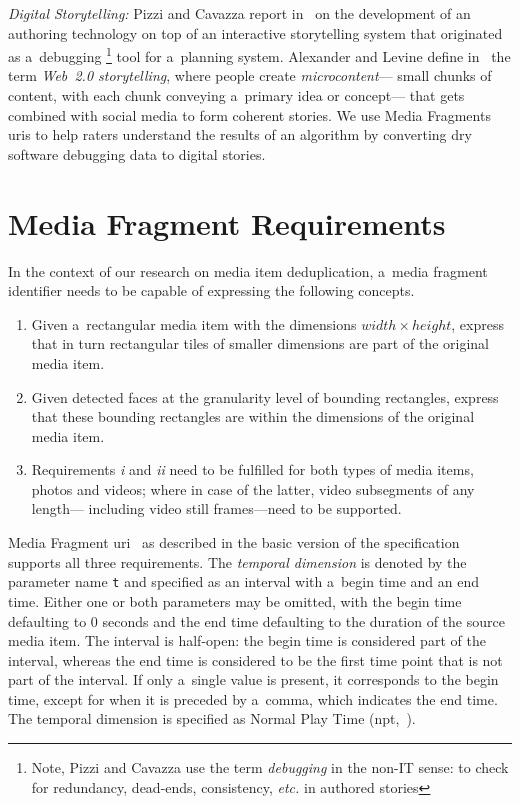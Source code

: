 \documentclass{article}
\begin{document}
\noindent \textit{Digital Storytelling:}
Pizzi and Cavazza report in~\cite{pizzi2008debugging} on the development of
an authoring technology on top of an interactive storytelling system
that originated as a~debugging%
\footnote{Note, Pizzi and Cavazza use the term \emph{debugging} in the non-IT sense:
to check for redundancy, dead-ends, consistency, \emph{etc.} in authored stories}
tool for a~planning system.
Alexander and Levine define in~\cite{alexander2008storytelling}
the term \emph{Web~2.0 storytelling}, where people create \emph{microcontent}---%
small chunks of content, with each chunk conveying a~primary idea or concept---%
that gets combined with social media to form coherent stories.
We use Media Fragments {\sc uri}s to help raters understand
the results of an algorithm by converting dry software debugging data
to digital stories.

\section{Media Fragment Requirements}
\label{sec:media-fragment-requirements}

In the context of our research on media item deduplication,
a~media fragment identifier needs to be capable of expressing the following concepts.

\begin{enumerate}[i]
  \item Given a~rectangular media item with the dimensions $ width \times height $,
    express that in turn rectangular tiles
    of smaller dimensions are part of the original media item.
  \item Given detected faces at the granularity level of bounding rectangles,
    express that these bounding rectangles are within the dimensions
    of the original media item.
  \item Requirements \textit{i} and \textit{ii} need to be fulfilled for both
    types of media items, photos and videos;
    where in case of the latter, video subsegments of any length---%
    including video still frames---need to be supported.
\end{enumerate}

Media Fragment {\sc uri}~\cite{troncy2012mediafragments} as described in
the basic version of the specification supports all three requirements.
The \emph{temporal dimension} is denoted by the parameter name \texttt{t}
and specified as an interval with a~begin time and an end time.
Either one or both parameters may be omitted,
with the begin time defaulting to 0 seconds
and the end time defaulting to the duration of the source media item.
The interval is half-open: the begin time is considered part of the interval,
whereas the end time is considered to be the first time point
that is not part of the interval.
If only a~single value is present, it corresponds to the begin time,
except for when it is preceded by a~comma, which indicates the end time.
The temporal dimension is specified as Normal Play Time ({\sc npt},~\cite{schulzrinne1998realtime}).
\end{document}
